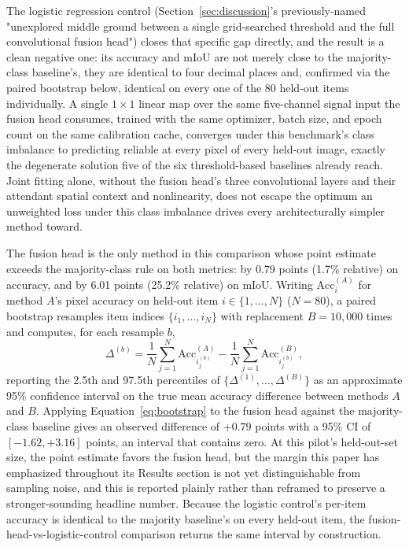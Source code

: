 \documentclass[review]{elsarticle}
\begin{document}
The logistic regression control (Section~\ref{sec:discussion}'s previously-named "unexplored middle ground between a single grid-searched threshold and the full convolutional fusion head") closes that specific gap directly, and the result is a clean negative one: its accuracy and mIoU are not merely close to the majority-class baseline's, they are identical to four decimal places and, confirmed via the paired bootstrap below, identical on every one of the 80 held-out items individually. A single $1\times1$ linear map over the same five-channel signal input the fusion head consumes, trained with the same optimizer, batch size, and epoch count on the same calibration cache, converges under this benchmark's class imbalance to predicting reliable at every pixel of every held-out image, exactly the degenerate solution five of the six threshold-based baselines already reach. Joint fitting alone, without the fusion head's three convolutional layers and their attendant spatial context and nonlinearity, does not escape the optimum an unweighted loss under this class imbalance drives every architecturally simpler method toward.

The fusion head is the only method in this comparison whose point estimate exceeds the majority-class rule on both metrics: by 0.79 points (1.7\% relative) on accuracy, and by 6.01 points (25.2\% relative) on mIoU. Writing $\mathrm{Acc}_i^{(A)}$ for method $A$'s pixel accuracy on held-out item $i \in \{1,\dots,N\}$ ($N=80$), a paired bootstrap resamples item indices $\{i_1,\dots,i_N\}$ with replacement $B=10{,}000$ times and computes, for each resample $b$,
\begin{equation}
\Delta^{(b)} = \frac{1}{N}\sum_{j=1}^{N} \mathrm{Acc}_{i_j^{(b)}}^{(A)} - \frac{1}{N}\sum_{j=1}^{N} \mathrm{Acc}_{i_j^{(b)}}^{(B)},
\label{eq:bootstrap}
\end{equation}
reporting the 2.5th and 97.5th percentiles of $\{\Delta^{(1)},\dots,\Delta^{(B)}\}$ as an approximate 95\% confidence interval on the true mean accuracy difference between methods $A$ and $B$. Applying Equation~\ref{eq:bootstrap} to the fusion head against the majority-class baseline gives an observed difference of $+0.79$ points with a 95\% CI of $[-1.62, +3.16]$ points, an interval that contains zero. At this pilot's held-out-set size, the point estimate favors the fusion head, but the margin this paper has emphasized throughout its Results section is not yet distinguishable from sampling noise, and this is reported plainly rather than reframed to preserve a stronger-sounding headline number. Because the logistic control's per-item accuracy is identical to the majority baseline's on every held-out item, the fusion-head-vs-logistic-control comparison returns the same interval by construction.
\end{document}
